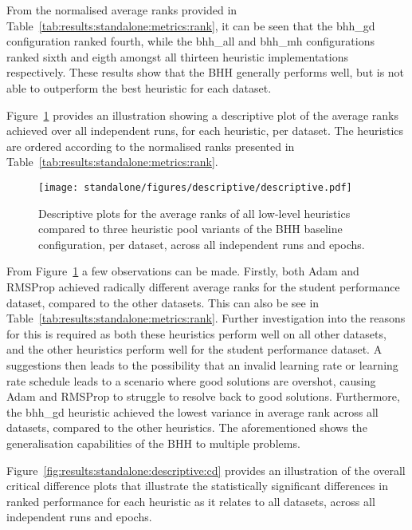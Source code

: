 From the normalised average ranks provided in Table~\ref{tab:results:standalone:metrics:rank}, it can be seen that the bhh\_gd configuration ranked fourth, while the bhh\_all and bhh\_mh configurations ranked sixth and eigth amongst all thirteen heuristic implementations respectively. These results show that the \acs{BHH} generally performs well, but is not able to outperform the best heuristic for each dataset.

Figure~\ref{fig:results:standalone:descriptive:descriptive} provides an illustration showing a descriptive plot of the average ranks achieved over all independent runs, for each heuristic, per dataset. The heuristics are ordered according to the normalised ranks presented in Table~\ref{tab:results:standalone:metrics:rank}.

\begin{figure}[htb]
      \centering
      \texttt{[image: standalone/figures/descriptive/descriptive.pdf]}
      \caption{Descriptive plots for the average ranks of all low-level heuristics compared to three heuristic pool variants of the \acs{BHH} baseline configuration, per dataset, across all independent runs and epochs.}
      \label{fig:results:standalone:descriptive:descriptive}
\end{figure}

From Figure~\ref{fig:results:standalone:descriptive:descriptive} a few observations can be made. Firstly, both \acs{Adam} and \acs{RMSProp} achieved radically different average ranks for the student performance dataset, compared to the other datasets. This can also be see in Table~\ref{tab:results:standalone:metrics:rank}. Further investigation into the reasons for this is required as both these heuristics perform well on all other datasets, and the other heuristics perform well for the student performance dataset. A suggestions then leads to the possibility that an invalid learning rate or learning rate schedule leads to a scenario where good solutions are overshot, causing \acs{Adam} and \acs{RMSProp} to struggle to resolve back to good solutions. Furthermore, the bhh\_gd heuristic achieved the lowest variance in average rank across all datasets, compared to the other heuristics. The aforementioned shows the generalisation capabilities of the \acs{BHH} to multiple problems.

Figure~\ref{fig:results:standalone:descriptive:cd} provides an illustration of the overall critical difference plots that illustrate the statistically significant differences in ranked performance for each heuristic as it relates to all datasets, across all independent runs and epochs.

